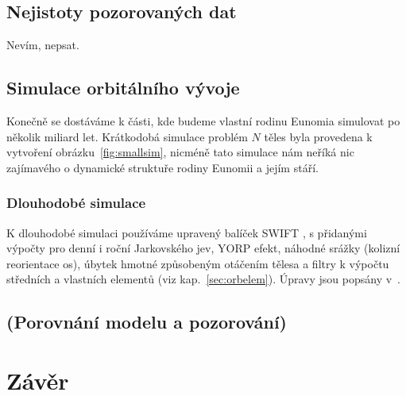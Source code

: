 \documentclass[A4paper, 12pt, oneside]{book}
\begin{document}
\section{Nejistoty pozorovaných dat}
Nevím, nepsat.

\pagebreak
\section{Simulace orbitálního vývoje}
Konečně se dostáváme k části, kde budeme vlastní rodinu Eunomia simulovat po několik miliard let. Krátkodobá simulace problém $N$ těles byla provedena k vytvoření obrázku~\ref{fig:smallsim}, nicméně tato simulace nám neříká nic zajímavého o dynamické struktuře rodiny Eunomii a jejím stáří.
\subsection{Dlouhodobé simulace}
K dlouhodobé simulaci používáme upravený balíček SWIFT \cite{levison94}, s přidanými výpočty pro denní i roční Jarkovského jev, YORP efekt, náhodné srážky (kolizní reorientace os), úbytek hmotné způsobeným otáčením tělesa a filtry k výpočtu středních a vlastních elementů (viz kap.~\ref{sec:orbelem}). Úpravy jsou popsány v~\cite{broz11}.

\pagebreak
\section{(Porovnání modelu a pozorování)}

\chapter{Závěr}

\newpage
\end{document}
